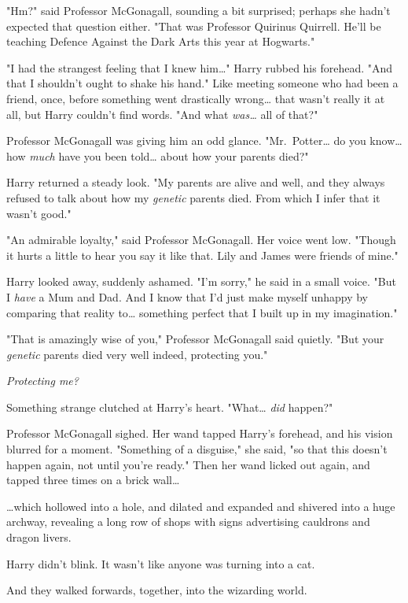 "Hm?" said Professor McGonagall, sounding a bit surprised; perhaps she hadn't
expected that question either. "That was Professor Quirinus Quirrell. He'll be
teaching Defence Against the Dark Arts this year at Hogwarts."

"I had the strangest feeling that I knew him{\ldots}" Harry rubbed his
forehead. "And that I shouldn't ought to shake his hand." Like meeting someone
who had been a friend, once, before something went drastically wrong{\ldots}
that wasn't really it at all, but Harry couldn't find words. "And what
\emph{was{\ldots}} all of that?"

Professor McGonagall was giving him an odd glance. "Mr.~Potter{\ldots} do you
know{\ldots} how \emph{much} have you been told{\ldots} about how your parents
died?"

Harry returned a steady look. "My parents are alive and well, and they always
refused to talk about how my \emph{genetic} parents died. From which I infer
that it wasn't good."

"An admirable loyalty," said Professor McGonagall. Her voice went low. "Though
it hurts a little to hear you say it like that. Lily and James were friends of
mine."

Harry looked away, suddenly ashamed. "I'm sorry," he said in a small voice.
"But I \emph{have} a Mum and Dad. And I know that I'd just make myself unhappy
by comparing that reality to{\ldots} something perfect that I built up in my
imagination."

"That is amazingly wise of you," Professor McGonagall said quietly. "But your
\emph{genetic} parents died very well indeed, protecting you."

\emph{Protecting me?}

Something strange clutched at Harry's heart. "What{\ldots} \emph{did} happen?"

Professor McGonagall sighed. Her wand tapped Harry's forehead, and his vision
blurred for a moment. "Something of a disguise," she said, "so that this
doesn't happen again, not until you're ready." Then her wand licked out again,
and tapped three times on a brick wall{\ldots}

{\ldots}which hollowed into a hole, and dilated and expanded and shivered into
a huge archway, revealing a long row of shops with signs advertising cauldrons
and dragon livers.

Harry didn't blink. It wasn't like anyone was turning into a cat.

And they walked forwards, together, into the wizarding world.

